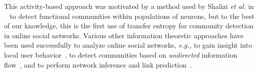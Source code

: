

This activity-based approach was motivated by a method used by Shalizi \emph{et al.} in ~\cite{shalizi2007discovering} to detect functional communities within populations of neurons, but to the best of our knowledge, this is the first use of transfer entropy for community detection in online social networks. Various other information theoretic approaches have been used successfully to analyze online social networks, \emph{e.g.,} to gain insight into local user behavior~\cite{darmon2013understanding}, to detect communities based on \emph{undirected} information flow~\cite{darmon2013detecting}, and to perform network inference and link prediction~\cite{ver2012information}.


